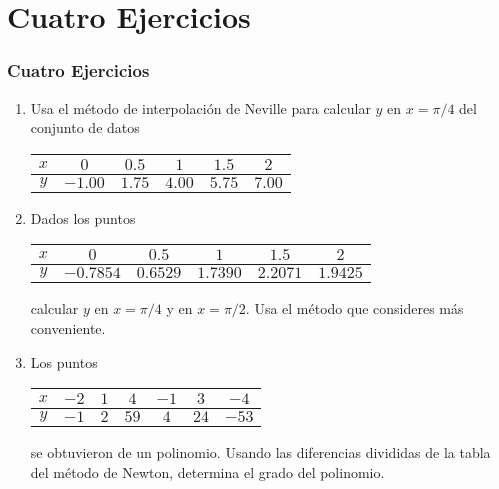 \section{Cuatro Ejercicios}
\begin{frame}
\frametitle{Cuatro Ejercicios}
\begin{enumerate}
\item Usa el método de interpolación de Neville para calcular $y$ en $x=\pi/4$ del conjunto de datos
\begin{table}[htbp]
\centering 
\begin{tabulary}{15cm}{c | c | c | c | c | c }
$x$ & $0$ & $0.5$ & $1$ & $1.5$ & $2$ \\
\midrule
$y$ & $-1.00$ & $1.75$ & $4.00$ & $5.75$ & $7.00$ 
\end{tabulary}
\end{table}
\item Dados los puntos
\begin{table}[htbp]
\centering 
\begin{tabulary}{15cm}{c | c | c | c | c | c }
$x$ & $0$ & $0.5$ & $1$ & $1.5$ & $2$ \\
\midrule
$y$ & $-0.7854$ & $0.6529$ & $1.7390$ & $2.2071$ & $1.9425$ 
\end{tabulary}
\end{table}
calcular $y$ en $x=\pi/4$ y en $x=\pi/2$. Usa el método que consideres más conveniente.
\end{enumerate}
\end{frame}
\begin{frame}
\begin{enumerate}
\setcounter{enumi}{2}
\item Los puntos 
\begin{table}[htbp]
\centering 
\begin{tabulary}{15cm}{c | c | c | c | c | c | c |}
$x$ & $-2$ & $1$ & $4$ & $-1$ & $3$ & $-4$ \\
\midrule
$y$ & $-1$ & $2$ & $59$ & $4$ & $24$ & $-53$ 
\end{tabulary}
\end{table}
se obtuvieron de un polinomio. Usando las diferencias divididas de la tabla del método de Newton, determina el grado del polinomio.
\end{enumerate}
\end{frame}
